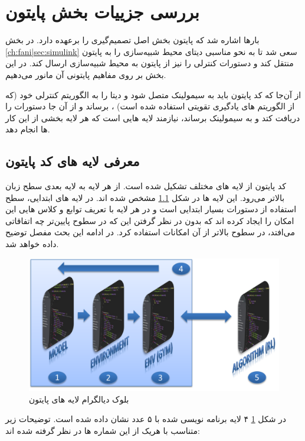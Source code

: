 \section{بررسی جزییات بخش پایتون}\label{ch:fani|sec:python}
بارها اشاره شد که پایتون بخش اصل تصمیم‌گیری را برعهده دارد. در بخش 
\ref{ch:fani|sec:simulink}
سعی شد تا به نحو مناسبی دیتای محیط شبیه‌سازی را به پایتون منتقل کند و دستورات کنترلی را نیز از پایتون به محیط شبیه‌سازی ارسال کند. در این بخش بر روی مفاهیم پایتونی آن مانور می‌دهیم.

از آن‌جا که کد پایتون باید به سیمولینک متصل شود و دیتا را به الگوریتم کنترلی خود (که از الگوریتم های یادگیری تقویتی استفاده شده است) ، برساند و از آن جا دستورات را دریافت کتد و به سیمولینک برساند، نیازمند لایه هایی است که هر لایه بخشی از این کار ها انجام دهد.

\subsection{معرفی لایه های کد پایتون}\label{ch:fani|sec:python|sub:layers}
کد پایتون از لایه های مختلف تشکیل شده است. از هر لایه به لایه بعدی سطح زبان بالاتر می‌رود. این لایه ها در شکل 
\ref{ch:fani|sec:python|sub:layers}
مشخص شده اند. در لایه های ابتدایی، سطح استفاده از دستورات بسیار ابتدایی است و در هر لایه با تعریف توابع و کلاس هایی این امکان را ایجاد کرده اند که بدون در نظر گرفتن این که در سطوح پایین‌تر چه اتفاقاتی می‌افتد، در سطوح بالاتر از آن امکانات استفاده کرد. در ادامه این بحث مفصل توضیح داده خواهد شد.



\begin{figure}
	\centering
	\includegraphics[width=0.8\linewidth]{Figures/python-layers-white}
	\caption{بلوک دیالگرام لایه های پایتون}
	\label{fig:python-layers}
\end{figure}
در شکل 
\ref{fig:python-layers}
۴ لایه برنامه نویسی شده با ۵ عدد نشان داده شده است. توضیحات زیر متناسب با هر‌یک از این شماره ها در نظر گرفته شده اند:




